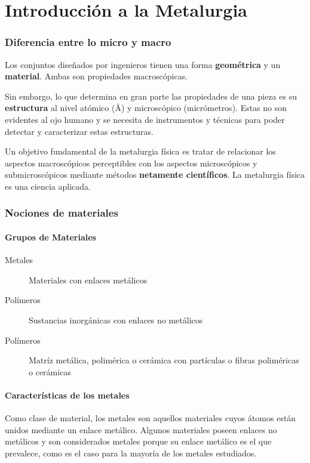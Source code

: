\part{Introducción a la Metalurgia}


\section{Diferencia entre lo micro y macro}

Los conjuntos diseñados por ingenieros tienen una forma \textbf{geométrica} y un \textbf{material}. Ambas son propiedades macroscópicas. 

Sin embargo, lo que determina en gran parte las propiedades de una pieza es su \textbf{estructura} al nivel atómico (Å) y microscópico (micrómetros). Estas no son evidentes al ojo humano y se necesita de instrumentos y técnicas para poder detectar y caracterizar estas estructuras.

Un objetivo fundamental de la metalurgia física es tratar de relacionar los aspectos macroscópicos perceptibles con los aspectos microscópicos y submicroscópicos mediante métodos \textbf{netamente científicos}. La metalurgia física es una ciencia aplicada.

\section{Nociones de materiales}

\subsection{Grupos de Materiales}

\begin{description}
    \item[Metales] Materiales con enlaces metálicos
    \item[Polímeros] Sustancias inorgánicas con enlaces no metálicos
    \item[Polímeros] Matríz metálica, polimérica o cerámica con partículas o fibras poliméricas o cerámicas 
\end{description}


\subsection{Características de los metales}
Como clase de material, los metales son aquellos materiales cuyos átomos están unidos mediante un enlace metálico. Algunos materiales poseen enlaces no metálicos y son considerados metales porque su enlace metálico es el que prevalece, como es el caso para la mayoría de los metales estudiados.

